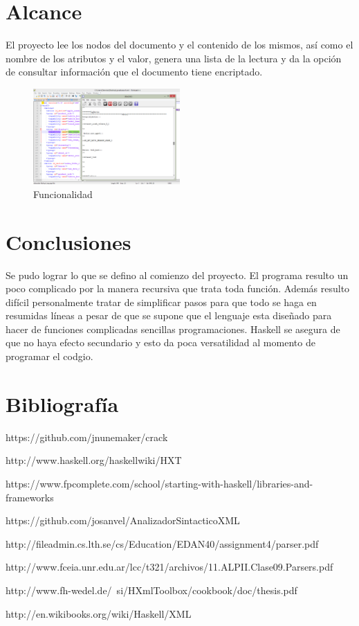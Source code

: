 \documentclass[12pt,oneside]{book}
\begin{document}
\chapter{Alcance}

El proyecto lee los nodos del documento y el contenido de los mismos, así como el nombre de los atributos y el valor, genera una lista de la lectura y da la opción de consultar información que el documento tiene encriptado.


\begin{figure}
  \centering
    \includegraphics[width=0.5\textwidth]{capturaHaskell1.png}
  \caption{Funcionalidad}
  \label{fig:logohaskell}
\end{figure}


\chapter{Conclusiones}
Se pudo lograr lo que se defino al comienzo del proyecto. El programa resulto un poco complicado por la manera recursiva que trata toda función. Además resulto difícil personalmente tratar de simplificar pasos para que todo se haga en resumidas líneas a pesar de que se supone que el lenguaje esta diseñado para hacer de funciones complicadas sencillas programaciones. Haskell se asegura de que no haya efecto secundario y esto da poca versatilidad al momento de programar el codgio.

\chapter{Bibliografía}

https://github.com/jnunemaker/crack

http://www.haskell.org/haskellwiki/HXT

https://www.fpcomplete.com/school/starting-with-haskell/libraries-and-frameworks

https://github.com/josanvel/AnalizadorSintacticoXML

http://fileadmin.cs.lth.se/cs/Education/EDAN40/assignment4/parser.pdf

http://www.fceia.unr.edu.ar/lcc/t321/archivos/11.ALPII.Clase09.Parsers.pdf

http://www.fh-wedel.de/~si/HXmlToolbox/cookbook/doc/thesis.pdf

http://en.wikibooks.org/wiki/Haskell/XML
\end{document}
